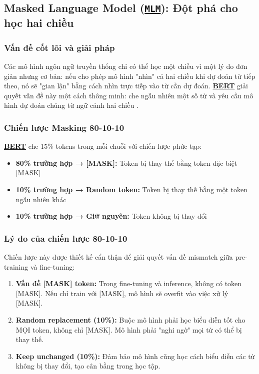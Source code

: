     \subsection{Masked Language Model (\hyperref[acro:mlm]{\texttt{MLM}}): Đột phá cho học hai chiều}
    \label{ssec:mlm}
    
    \subsubsection{Vấn đề cốt lõi và giải pháp}
    Các mô hình ngôn ngữ truyền thống chỉ có thể học một chiều vì một lý do đơn giản nhưng cơ bản: nếu cho phép mô hình "nhìn" cả hai chiều khi dự đoán từ tiếp theo, nó sẽ "gian lận" bằng cách nhìn trực tiếp vào từ cần dự đoán. \hyperref[acro:bert]{\textbf{BERT}} giải quyết vấn đề này một cách thông minh: che ngẫu nhiên một số từ và yêu cầu mô hình dự đoán chúng từ ngữ cảnh hai chiều \cite{devlin2018bert}.
    
    \subsubsection{Chiến lược Masking 80-10-10}
    \hyperref[acro:bert]{\textbf{BERT}} che 15\% tokens trong mỗi chuỗi với chiến lược phức tạp:
    
    \begin{itemize}
        \item \textbf{80\% trường hợp → [MASK]:} Token bị thay thế bằng token đặc biệt [MASK]
        \item \textbf{10\% trường hợp → Random token:} Token bị thay thế bằng một token ngẫu nhiên khác
        \item \textbf{10\% trường hợp → Giữ nguyên:} Token không bị thay đổi
    \end{itemize}
    
    \subsubsection{Lý do của chiến lược 80-10-10}
    Chiến lược này được thiết kế cẩn thận để giải quyết vấn đề mismatch giữa pre-training và fine-tuning:
    
    \begin{enumerate}
        \item \textbf{Vấn đề [MASK] token:} Trong fine-tuning và inference, không có token [MASK]. Nếu chỉ train với [MASK], mô hình sẽ overfit vào việc xử lý [MASK].
        
        \item \textbf{Random replacement (10\%):} Buộc mô hình phải học biểu diễn tốt cho MỌI token, không chỉ [MASK]. Mô hình phải "nghi ngờ" mọi từ có thể bị thay thế.
        
        \item \textbf{Keep unchanged (10\%):} Đảm bảo mô hình cũng học cách biểu diễn các từ không bị thay đổi, tạo cân bằng trong học tập.
    \end{enumerate}
    
